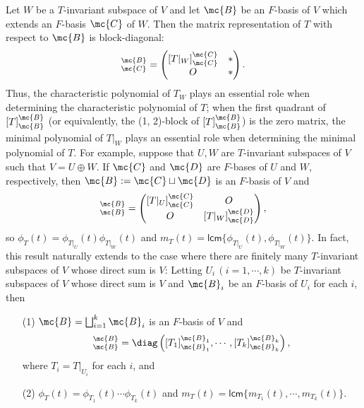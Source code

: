 \begin{obs}
    Let $W$ be a $T$-invariant subspace of $V$ and let $\mc{B}$ be an $F$-basis of $V$ which extends an $F$-basis $\mc{C}$ of $W$.
    Then the matrix representation of $T$ with respect to $\mc{B}$ is block-diagonal:
    \begin{align*}
        [T]^\mc{B}_\mc{C}=\begin{pmatrix}
            [T|_W]^\mc{C}_\mc{C}&*\\O&*
        \end{pmatrix}.
    \end{align*}
    Thus, the characteristic polynomial of $T_W$ plays an essential role when determining the characteristic polynomial of $T$; when the first quadrant of $[T]^\mc{B}_\mc{B}$ (or equivalently, the (1, 2)-block of $[T]^\mc{B}_\mc{B}$) is the zero matrix, the minimal polynomial of $T|_W$ plays an essential role when determining the minimal polynomial of $T$.
    For example, suppose that $U, W$ are $T$-invariant subspaces of $V$ such that $V=U\oplus W$.
    If $\mc{C}$ and $\mc{D}$ are $F$-bases of $U$ and $W$, respectively, then $\mc{B}:=\mc{C}\sqcup\mc{D}$ is an $F$-basis of $V$ and
    \begin{align*}
        [T]^\mc{B}_\mc{B}=\begin{pmatrix}
            [T|_U]^\mc{C}_\mc{C}    &   O   \\
            O   &   [T|_W]^\mc{D}_\mc{D}
        \end{pmatrix},
    \end{align*}
    so $\phi_T(t)=\phi_{T|_U}(t)\phi_{T|_W}(t)$ and $m_T(t)=\textsf{lcm}\{\phi_{T|_U}(t), \phi_{T|_W}(t)\}$.
    In fact, this result naturally extends to the case where there are finitely many $T$-invariant subspaces of $V$ whose direct sum is $V$: Letting $U_i\,(i=1, \cdots, k)$ be $T$-invariant subspaces of $V$ whose direct sum is $V$ and $\mc{B}_i$ be an $F$-basis of $U_i$ for each $i$, then
    \begin{enumerate}
        \item[(1)]
        {
            $\mc{B}=\bigsqcup_{i=1}^k \mc{B}_i$ is an $F$-basis of $V$ and
            \begin{align*}
                [T]^\mc{B}_\mc{B}=\diag\left([T_1]^{\mc{B}_1}_{\mc{B}_1}, \cdots, [T_k]^{\mc{B}_k}_{\mc{B}_k}\right),
            \end{align*}
            where $T_i=T|_{U_i}$ for each $i$, and
        }
        \item[(2)]
        {
            $\phi_T(t)=\phi_{T_1}(t)\cdots\phi_{T_k}(t)$ and $m_T(t)=\textsf{lcm}\{m_{T_1}(t), \cdots, m_{T_k}(t)\}$.
        }
    \end{enumerate}
\end{obs}

